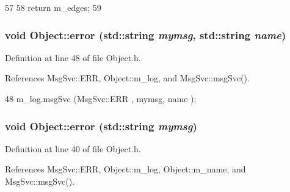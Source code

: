 \begin{DoxyCode}
57                            {  
58     return m_edges;
59   }
\end{DoxyCode}
\hypertarget{classObject_ad7f6c457733082efa2f9ff5f5c8e119a}{
\subsubsection[{error}]{\setlength{\rightskip}{0pt plus 5cm}void Object::error (std::string {\em mymsg}, \/  std::string {\em name})}}
\label{classObject_ad7f6c457733082efa2f9ff5f5c8e119a}


Definition at line 48 of file Object.h.

References MsgSvc::ERR, Object::m\_\-log, and MsgSvc::msgSvc().


\begin{DoxyCode}
48 { m_log.msgSvc (MsgSvc::ERR     , mymsg, name ); }
\end{DoxyCode}
\hypertarget{classObject_a204a95f57818c0f811933917a30eff45}{
\subsubsection[{error}]{\setlength{\rightskip}{0pt plus 5cm}void Object::error (std::string {\em mymsg})}}
\label{classObject_a204a95f57818c0f811933917a30eff45}


Definition at line 40 of file Object.h.

References MsgSvc::ERR, Object::m\_\-log, Object::m\_\-name, and MsgSvc::msgSvc().

